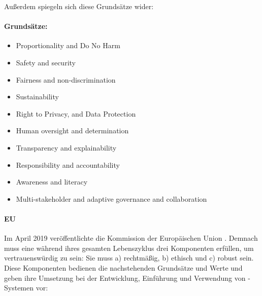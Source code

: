 \documentclass[12pt]{report}
\begin{document}
Außerdem spiegeln sich diese Grundsätze wider:

\paragraph{Grundsätze:}
\begin{itemize}
	\item  Proportionality and Do No Harm
	\item  Safety and security
	\item  Fairness and non-discrimination
	\item  Sustainability
	\item  Right to Privacy, and Data Protection
	\item  Human oversight and determination
	\item  Transparency and explainability
	\item  Responsibility and accountability
	\item  Awareness and literacy
	\item  Multi-stakeholder and adaptive governance and collaboration
\end{itemize}
\paragraph{EU\cite{EUCommision}\\}
Im April 2019 veröffentlichte die Kommission der Europäischen Union \cite{EUCommision}.
Demnach muss eine  während ihres gesamten Lebenszyklus drei Komponenten erfüllen, um vertrauenswürdig zu sein: Sie muss a) rechtmäßig, b) ethisch und c) robust sein. Diese Komponenten bedienen die nachstehenden Grundsätze und Werte und geben ihre Umsetzung bei der Entwicklung, Einführung und Verwendung von -Systemen vor:
\end{document}
